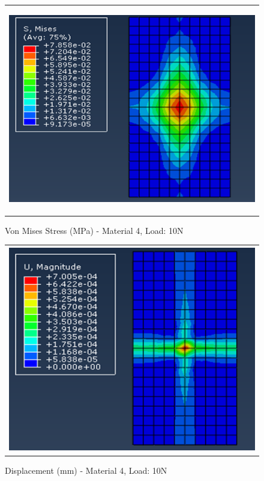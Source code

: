 \documentclass[a4paper,12pt]{article}
\numberwithin{equation}{section}
\numberwithin{figure}{section}
\begin{document}
\begin{figure}[H]
  \centering
  \begin{tabular}{@{}c@{}}
    \includegraphics[width=0.7\linewidth,height=255pt]{Results/Point Loading/M4_VMS_L2.png} \\
  \end{tabular}
  \caption{Von Mises Stress (MPa) - Material 4, Load: 10N}
\end{figure}

\begin{figure}[H]
  \centering
  \begin{tabular}{@{}c@{}}
    \includegraphics[width=0.7\linewidth,height=255pt]{Results/Point Loading/M4_DIS_L2.png} \\
  \end{tabular}
  \caption{Displacement (mm) - Material 4, Load: 10N}
\end{figure}
\end{document}
